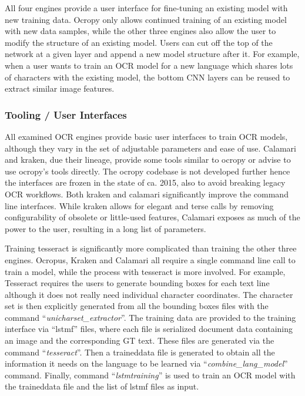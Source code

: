 \documentclass[conference]{IEEEtran}
\begin{document}
All four engines provide a user interface for fine-tuning an
existing model with new training data. Ocropy only allows
continued training of an existing model with new data samples,
while the other three engines also allow the user to modify the
structure of an existing model. Users can cut off the top of the 
network at a given layer and append a new model structure after it.
For example, when a user wants to train an OCR model for a new
language which shares lots of characters with the existing model,
the bottom CNN layers can be reused to extract similar image
features.


\subsubsection{Tooling / User Interfaces}

All examined OCR engines provide basic user interfaces to
train OCR models, although they vary in the set of adjustable
parameters and ease of use. Calamari and kraken, due their lineage,
provide some tools similar to ocropy or advise to use ocropy's tools
directly. The ocropy codebase is not developed further hence the interfaces
are frozen in the state of ca. 2015, also to avoid breaking legacy OCR
workflows. Both kraken and calamari significantly improve the command
line interfaces. While kraken allows for elegant and terse calls by
removing configurability of obsolete or little-used features, Calamari
exposes as much of the power to the user, resulting in a long list
of parameters.


Training tesseract is
significantly more complicated than training the other three engines. Ocropus,
Kraken and Calamari all require a single command line call to train
a model, while the process with tesseract is more involved.
For example, Tesseract requires the users
to generate bounding boxes for each text line although it does not
really need individual character coordinates. The character set is then
explicitly generated from all the bounding boxes files with the
command ``\textit{unicharset\_extractor}''. The training data are
provided to the training interface via ``lstmf'' files, where each
file is serialized document data containing an image and the
corresponding GT text. These files are generated via the
command ``\textit{tesseract}''. Then a traineddata file is generated
to obtain all the information it needs on the language to be
learned via ``\textit{combine\_lang\_model}'' command. Finally,
command ``\textit{lstmtraining}'' is used to train an OCR model with
the traineddata file and the list of lstmf files as input.
\end{document}
